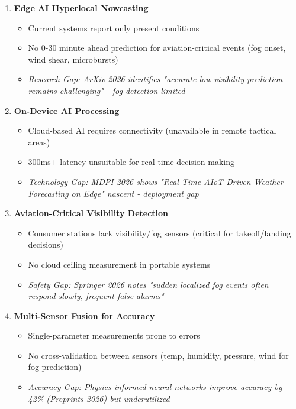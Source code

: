 \begin{enumerate}[leftmargin=*]
    \item \textcolor{missingcolor}{\textbf{Edge AI Hyperlocal Nowcasting}}
    \begin{itemize}
        \item Current systems report only present conditions
        \item No 0-30 minute ahead prediction for aviation-critical events (fog onset, wind shear, microbursts)
        \item \textit{Research Gap: ArXiv 2026 identifies "accurate low-visibility prediction remains challenging" - fog detection limited}
    \end{itemize}
    
    \item \textcolor{missingcolor}{\textbf{On-Device AI Processing}}
    \begin{itemize}
        \item Cloud-based AI requires connectivity (unavailable in remote tactical areas)
        \item 300ms+ latency unsuitable for real-time decision-making
        \item \textit{Technology Gap: MDPI 2026 shows "Real-Time AIoT-Driven Weather Forecasting on Edge" nascent - deployment gap}
    \end{itemize}
    
    \item \textcolor{missingcolor}{\textbf{Aviation-Critical Visibility Detection}}
    \begin{itemize}
        \item Consumer stations lack visibility/fog sensors (critical for takeoff/landing decisions)
        \item No cloud ceiling measurement in portable systems
        \item \textit{Safety Gap: Springer 2026 notes "sudden localized fog events often respond slowly, frequent false alarms"}
    \end{itemize}
    
    \item \textcolor{missingcolor}{\textbf{Multi-Sensor Fusion for Accuracy}}
    \begin{itemize}
        \item Single-parameter measurements prone to errors
        \item No cross-validation between sensors (temp, humidity, pressure, wind for fog prediction)
        \item \textit{Accuracy Gap: Physics-informed neural networks improve accuracy by 42\% (Preprints 2026) but underutilized}
    \end{itemize}
    

\end{enumerate}

